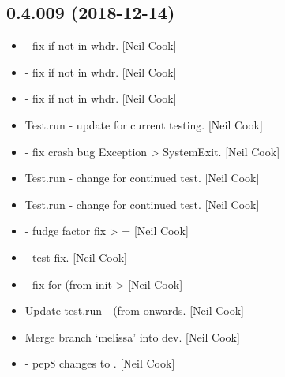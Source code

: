 \documentclass[a4paper,10pt,english]{report}
\begin{document}
\subsection{0.4.009 (2018-12-14)}
\label{\detokenize{misc/changelog:id233}}\begin{itemize}
\item {} 
 - fix if  not in whdr. {[}Neil Cook{]}

\item {} 
 - fix if  not in whdr. {[}Neil Cook{]}

\item {} 
 - fix if  not in whdr. {[}Neil Cook{]}

\item {} 
Test.run - update for current testing. {[}Neil Cook{]}

\item {} 
 - fix crash bug Exception \textendash{}\textgreater{} SystemExit.
{[}Neil Cook{]}

\item {} 
Test.run - change for continued test. {[}Neil Cook{]}

\item {} 
Test.run - change for continued test. {[}Neil Cook{]}

\item {} 
 - fudge factor fix \textendash{}\textgreater{}  =
 {[}Neil Cook{]}

\item {} 
 - test fix. {[}Neil Cook{]}

\item {} 
 - fix for  (from init \textendash{}\textgreater{} 
{[}Neil Cook{]}

\item {} 
Update test.run -  (from  onwards. {[}Neil Cook{]}

\item {} 
Merge branch ‘melissa’ into dev. {[}Neil Cook{]}

\item {} 
 - pep8 changes to . {[}Neil Cook{]}


\end{itemize}
\end{document}
